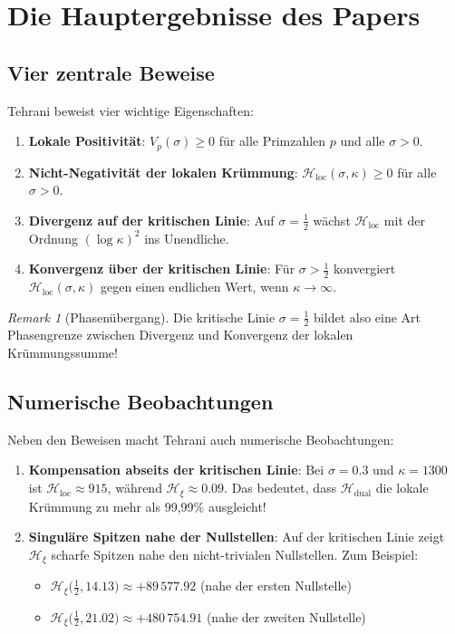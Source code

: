\documentclass[11pt,a4paper]{article}
\newcommand{\Hxi}{\mathcal{H}_{\xi}}
\newcommand{\Hlocal}{\mathcal{H}_{\mathrm{loc}}}
\newcommand{\Hdual}{\mathcal{H}_{\mathrm{dual}}}
\theoremstyle{definition}
\theoremstyle{remark}
\newtheorem{remark}[definition]{Remark}
\begin{document}
	\section{Die Hauptergebnisse des Papers}\label{sec:hauptergebnisse}
	
	\subsection{Vier zentrale Beweise}
	
	Tehrani beweist vier wichtige Eigenschaften:
	
	\begin{enumerate}
		\item \textbf{Lokale Positivit\"at}: $V_p(\sigma) \geq 0$ f\"ur alle Primzahlen $p$ und alle $\sigma > 0$.
		\item \textbf{Nicht-Negativit\"at der lokalen Kr\"ummung}: $\Hlocal(\sigma,\kappa) \geq 0$ f\"ur alle $\sigma > 0$.
		\item \textbf{Divergenz auf der kritischen Linie}: Auf $\sigma = \frac{1}{2}$ w\"achst $\Hlocal$ mit der
		Ordnung $(\log\kappa)^2$ ins Unendliche.
		\item \textbf{Konvergenz \"uber der kritischen Linie}: F\"ur $\sigma > \frac{1}{2}$ konvergiert
		$\Hlocal(\sigma,\kappa)$ gegen einen endlichen Wert, wenn $\kappa \to \infty$.
	\end{enumerate}
	
	\begin{remark}[Phasen\"ubergang]
		Die kritische Linie $\sigma = \frac{1}{2}$ bildet also eine Art Phasengrenze zwischen
		Divergenz und Konvergenz der lokalen Kr\"ummungssumme!
	\end{remark}
	
	\subsection{Numerische Beobachtungen}
	
	Neben den Beweisen macht Tehrani auch numerische Beobachtungen:
	
	\begin{enumerate}
		\item \textbf{Kompensation abseits der kritischen Linie}: Bei $\sigma = 0.3$ und $\kappa = 1300$
		ist $\Hlocal \approx 915$, w\"ahrend $\Hxi \approx 0.09$. Das bedeutet, dass $\Hdual$ die
		lokale Kr\"ummung zu mehr als 99{,}99\% ausgleicht!
		\item \textbf{Singul\"are Spitzen nahe der Nullstellen}: Auf der kritischen Linie zeigt $\Hxi$
		scharfe Spitzen nahe den nicht-trivialen Nullstellen. Zum Beispiel:
		\begin{itemize}
			\item $\Hxi\bigl(\tfrac{1}{2}, 14.13\bigr) \approx +89\,577.92$ (nahe der ersten Nullstelle)
			\item $\Hxi\bigl(\tfrac{1}{2}, 21.02\bigr) \approx +480\,754.91$ (nahe der zweiten Nullstelle)
		\end{itemize}
	\end{enumerate}
	
\end{document}
